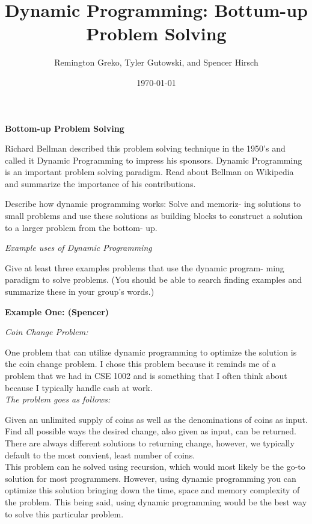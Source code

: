 \documentclass{article}
\begin{document}
\title{\textbf{Dynamic Programming: Bottum-up Problem Solving}}
\author{Remington Greko, Tyler Gutowski, and Spencer Hirsch}
\date{\today}

\maketitle

\noindent \textbf{Bottom-up Problem Solving} 


Richard Bellman described this problem solving technique in the
1950’s and called it Dynamic Programming to impress his sponsors.
Dynamic Programming is an important problem solving paradigm.
Read about Bellman on Wikipedia and summarize the importance
of his contributions.

\medskip

Describe how dynamic programming works: Solve and memoriz-
ing solutions to small problems and use these solutions as building
blocks to construct a solution to a larger problem from the bottom-
up.

\bigskip

\noindent \textit{Example uses of Dynamic Programming}


Give at least three examples problems that use the dynamic program-
ming paradigm to solve problems. (You should be able to search
finding examples and summarize these in your group’s words.)

\bigskip

\noindent \textbf{Example One: (Spencer)}

\noindent \textit{Coin Change Problem:}

One problem that can utilize dynamic programming to optimize the
solution is the coin change problem. I chose this problem because 
it reminds me of a problem that we had in CSE 1002 and is something
that I often think about because I typically handle cash at work.\\

\noindent \textit{The problem goes as follows:}

Given an unlimited supply of coins as well as the denominations of
coins as input. Find all possible ways the desired change, also given 
as input, can be returned. There are always different solutions to
returning change, however, we typically default to the most convient,
least number of coins.\\

This problem can he solved using recursion, which would most likely be
the go-to solution for most programmers. However, using dynamic programming
you can optimize this solution bringing down the time, space and memory
complexity of the problem. This being said, using dynamic programming would
be the best way to solve this particular problem.
\end{document}
